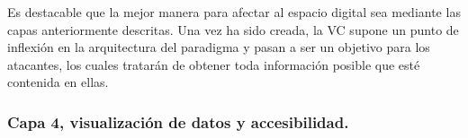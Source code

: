 \documentclass[../main.tex]{subfiles}
\begin{document}
\begin{tcolorbox}[colback=gray!10!white, colframe=gray!50!black, title=Análisis de la Capa \theanalisis]\label{analisis-C3}
Es destacable que la mejor manera para afectar al espacio digital sea mediante las capas anteriormente descritas. Una vez ha sido creada, la \acrshort{VC} supone un punto de inflexión en la arquitectura del paradigma y pasan a ser un objetivo para los atacantes, los cuales tratarán de obtener toda información posible que esté contenida en ellas. 


\end{tcolorbox}

\newpage
\subsubsection{Capa 4, visualización de datos y accesibilidad.}
\end{document}
